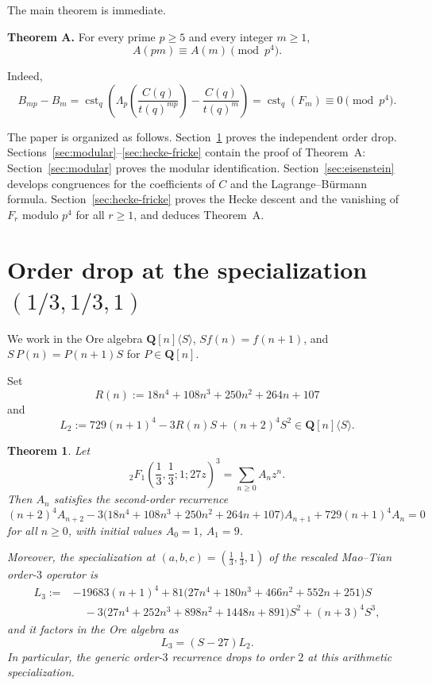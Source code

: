 \documentclass[11pt]{amsart}
\newtheorem{theorem}{Theorem}[section]
\theoremstyle{remark}
\DeclareMathOperator{\cst}{cst}
\newcommand{\Q}{\mathbf{Q}}
\begin{document}
The main theorem is immediate.

\medskip
\noindent\textbf{Theorem A.}
For every prime $p\ge5$ and every integer $m\ge1$,
\[
A(pm)\equiv A(m)\pmod{p^4}.
\]

Indeed,
\[
B_{mp}-B_m
=
\cst_q\!\left(
\Lambda_p\!\left(\frac{C(q)}{t(q)^{mp}}\right)-\frac{C(q)}{t(q)^m}
\right)
=
\cst_q(F_m)
\equiv0\pmod{p^4}.
\]

The paper is organized as follows. Section~\ref{sec:orderdrop} proves the independent order drop.
Sections~\ref{sec:modular}--\ref{sec:hecke-fricke} contain the proof of Theorem~A: Section~\ref{sec:modular}
proves the modular identification. Section~\ref{sec:eisenstein} develops congruences for the coefficients of
$C$ and the Lagrange--B\"urmann formula. Section~\ref{sec:hecke-fricke} proves the Hecke descent and the
vanishing of $F_r$ modulo $p^4$ for all $r\ge1$, and deduces Theorem~A.

\section{Order drop at the specialization $(1/3,1/3,1)$}\label{sec:orderdrop}

We work in the Ore algebra
$\Q[n]\langle S\rangle$,
$Sf(n)=f(n+1)$,
and $S\,P(n)=P(n+1)S$ for $P\in\Q[n]$.

Set
\[
R(n):=18n^4+108n^3+250n^2+264n+107
\]
and
\[
L_2:=729(n+1)^4-3R(n)S+(n+2)^4S^2\in\Q[n]\langle S\rangle.
\]

\begin{theorem}\label{thm:orderdrop}
Let
\[
{}_2F_1\!\left(\frac13,\frac13;1;27z\right)^3=\sum_{n\ge0}A_n z^n.
\]
Then $A_n$ satisfies the second-order recurrence
\begin{equation}\label{eq:S1-rec}
(n+2)^4A_{n+2}
-3\bigl(18n^4+108n^3+250n^2+264n+107\bigr)A_{n+1}
+729(n+1)^4A_n=0
\end{equation}
for all $n\ge 0$, with initial values
$A_0=1$, $A_1=9$.

Moreover, the specialization at $(a,b,c)=(\frac13,\frac13,1)$ of the rescaled
Mao--Tian order-$3$ operator is
\begin{equation}\label{eq:L3explicit}
\begin{aligned}
L_3:={}&-19683(n+1)^4
+81\bigl(27n^4+180n^3+466n^2+552n+251\bigr)S \\
&\quad-3\bigl(27n^4+252n^3+898n^2+1448n+891\bigr)S^2
+(n+3)^4S^3,
\end{aligned}
\end{equation}
and it factors in the Ore algebra as
\begin{equation}\label{eq:ore-factor}
L_3=(S-27)L_2.
\end{equation}
In particular, the generic order-$3$ recurrence drops to order $2$ at this arithmetic specialization.
\end{theorem}
\end{document}
